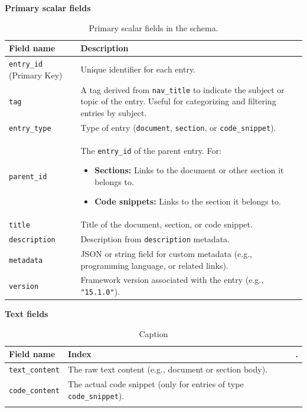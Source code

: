 \textbf{Primary scalar fields}
\begin{table}[H]
	\centering
	\label{tab:primary_scalar_fields}
	\begin{tabular}{lp{10cm}}
		\hline
		\textbf{Field name}          & \textbf{Description}                                                                                      \\ \hline
		\texttt{entry\_id} (Primary Key) & Unique identifier for each entry.                                   \\ \hline
		\texttt{tag}                  & A tag derived from \texttt{nav\_title} to indicate the subject or topic of the entry. Useful for categorizing and filtering entries by subject. \\ \hline
		\texttt{entry\_type}         & Type of entry (\texttt{document}, \texttt{section}, or \texttt{code\_snippet}).                              \\ \hline
		\texttt{parent\_id}          & The \texttt{entry\_id} of the parent entry. For:
		\begin{itemize}
			\item \textbf{Sections:} Links to the document or other section it belongs to.
			\item \textbf{Code snippets:} Links to the section it belongs to.
		\end{itemize} \\ \hline
		\texttt{title}               & Title of the document, section, or code snippet.                                           \\ \hline
		\texttt{description}         & Description from \texttt{description} metadata.                                          \\ \hline
		\texttt{metadata}            & JSON or string field for custom metadata (e.g., programming language, or related links).             \\ \hline
		\texttt{version}             & Framework version associated with the entry (e.g., \texttt{"15.1.0"}).                                      \\ \hline
	\end{tabular}
	\caption{Primary scalar fields in the schema.}
\end{table}

\textbf{Text fields}
\begin{table}[H]
	\centering
	\begin{tabular}{lp{4cm}p{5cm}}
		\hline
		\textbf{Field name}                 & \textbf{Index}                  & \textbf{.}          \\ \hline
		\texttt{text\_content}      &  The raw text content (e.g., document or section body). \\ \hline
		\texttt{code\_content}      &  The actual code snippet (only for entries of type \texttt{code\_snippet}). \\ \hline
		& 
	\end{tabular}
	\caption{Caption}
	\label{tab:my_label}
\end{table}

